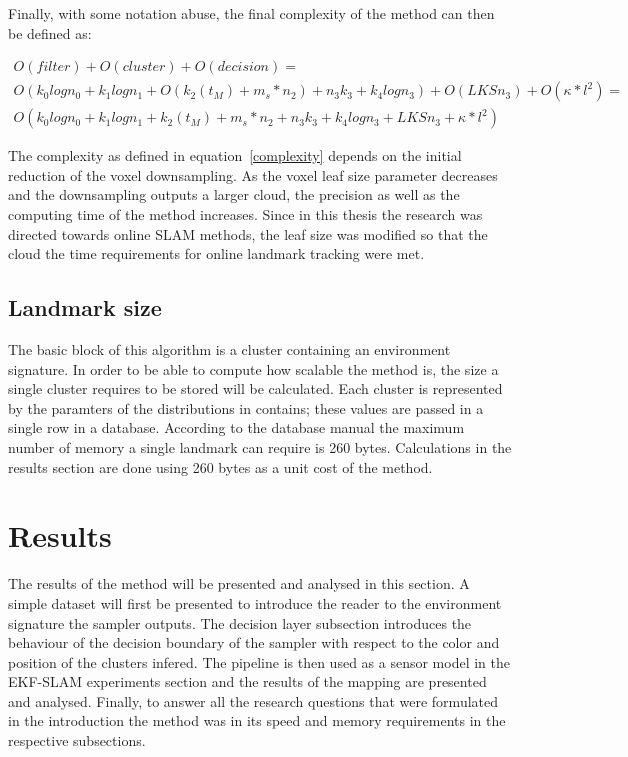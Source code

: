 \documentclass[twoside,hidelinks]{article}
\begin{document}
Finally, with some notation abuse, the final complexity of the method can then be defined as:

\begin{equation} \label{complexity}
\begin{split}
O(filter) + O(cluster) + O(decision) = \\
O(k_{0}logn_{0} + k_{1}logn_{1} + O(k_{2}(t_M)+ m_s*n_{2}) + n_{3}k_{3} + k_{4}logn_{3} ) + O(LKSn_3) + O(\kappa * l^2)=\\
O(k_{0}logn_{0} + k_{1}logn_{1} + k_{2}(t_M)+ m_s*n_{2} + n_{3}k_{3} + k_{4}logn_{3} + LKSn_3 + \kappa * l^2)
\end{split}
\end{equation}

The complexity as defined in equation~\ref{complexity} depends on the initial reduction of the voxel downsampling. As the voxel leaf size parameter decreases and the downsampling outputs a larger cloud, the precision as well as the computing time of the method increases. Since in this thesis the research was directed towards online SLAM methods, the leaf size was modified so that the cloud the time requirements for online landmark tracking were met.

\subsection{Landmark size}


The basic block of this algorithm is a cluster containing an environment signature. In order to be able to compute how scalable the method is, the size a single cluster requires to be stored will be calculated. Each cluster is represented by the paramters of the distributions in contains; these values are passed in a single row in a database\cite{sqlite}. According to the database manual the maximum number of memory a single landmark can require is 260 bytes. Calculations in the results section are done using 260 bytes as a unit cost of the method. 

\newpage
\section{Results}
\label{sec:results}

The results of the method will be presented and analysed in this section. A simple dataset will first be presented to introduce the reader to the environment signature the sampler outputs. The decision layer subsection introduces the behaviour of the decision boundary of the sampler with respect to the color and position of the clusters infered. The pipeline is then used as a sensor model in the EKF-SLAM experiments section and the results of the mapping are presented and analysed. Finally, to answer all the research questions that were formulated in the introduction the method was in its speed and memory requirements in the respective subsections.
\end{document}
